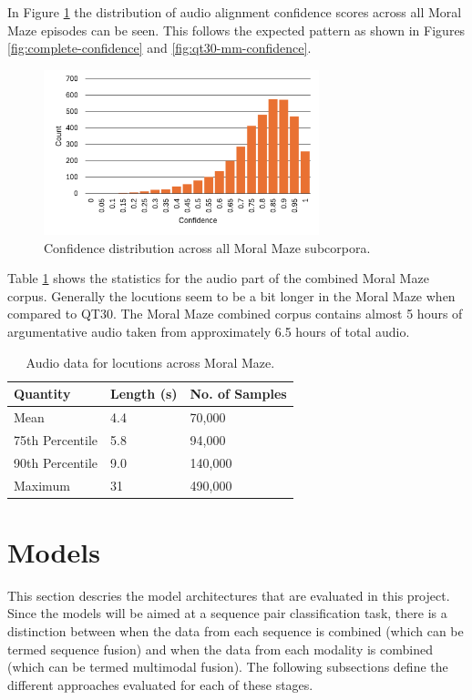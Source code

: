 \documentclass[twocolumn]{article}
\begin{document}
In Figure \ref{fig:moral-confidence} the distribution of audio alignment
confidence scores across all Moral Maze episodes can be seen. This
follows the expected pattern as shown in Figures
\ref{fig:complete-confidence} and \ref{fig:qt30-mm-confidence}.

\begin{figure}[h]
\centering
\includegraphics[width=8cm]{moral-confidence}
\caption{Confidence distribution across all Moral Maze subcorpora. \label{fig:moral-confidence}}
\end{figure}

Table \ref{tbl:audio-data-mm} shows the statistics for the audio part of
the combined Moral Maze corpus. Generally the locutions seem to be a bit
longer in the Moral Maze when compared to QT30. The Moral Maze combined
corpus contains almost 5 hours of argumentative audio taken from
approximately 6.5 hours of total audio.

\begin{table}[h]
\centering
\caption{Audio data for locutions across Moral Maze.\label{tbl:audio-data-mm}}
\begin{tabular}{|l|ll|}
\hline
Quantity        & Length (s) & No. of Samples \\ \hline
Mean            & 4.4        & 70,000         \\
75th Percentile & 5.8        & 94,000         \\
90th Percentile & 9.0        & 140,000        \\
Maximum         & 31         & 490,000        \\ \hline
\end{tabular}
\end{table}

\section{Models}\label{sec:models}

This section descries the model architectures that are evaluated in this
project. Since the models will be aimed at a sequence pair
classification task, there is a distinction between when the data from
each sequence is combined (which can be termed sequence fusion) and when
the data from each modality is combined (which can be termed multimodal
fusion). The following subsections define the different approaches
evaluated for each of these stages.
\end{document}
